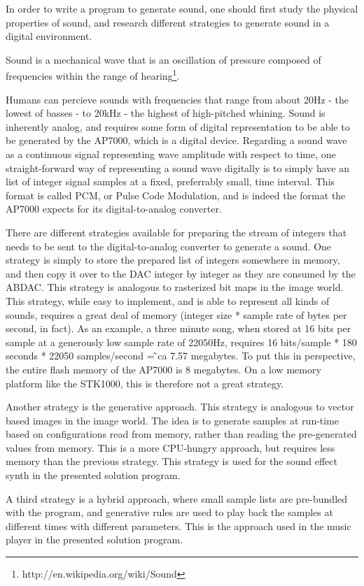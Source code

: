 In order to write a program to generate sound, one should first study the physical properties of sound, and research different strategies to generate sound in a digital environment.

Sound is a mechanical wave that is an oscillation of pressure composed of frequencies within the range of hearing\footnote{http://en.wikipedia.org/wiki/Sound}.

Humans can percieve sounds with frequencies that range from about 20Hz - the lowest of basses - to 20kHz - the highest of high-pitched whining.
Sound is inherently analog, and requires some form of digital representation to be able to be generated by the AP7000, which is a digital device.
Regarding a sound wave as a continuous signal representing wave amplitude with respect to time, one straight-forward way of representing a sound wave digitally is to simply have an list of integer signal samples at a fixed, preferrably small, time interval.
This format is called PCM, or Pulse Code Modulation, and is indeed the format the AP7000 expects for its digital-to-analog converter.

There are different strategies available for preparing the stream of integers that needs to be sent to the digital-to-analog converter to generate a sound.
One strategy is simply to store the prepared list of integers somewhere in memory, and then copy it over to the DAC integer by integer as they are consumed by the ABDAC.
This strategy is analogous to rasterized bit maps in the image world.
This strategy, while easy to implement, and is able to represent all kinds of sounds, requires a great deal of memory (integer size * sample rate of bytes per second, in fact).
As an example, a three minute song, when stored at 16 bits per sample at a generously low sample rate of 22050Hz, requires 16 bits/sample * 180 seconds * 22050 samples/second = ̃ca 7.57 megabytes.
To put this in perspective, the entire flash memory of the AP7000 is 8 megabytes.
On a low memory platform like the STK1000, this is therefore not a great strategy.

Another strategy is the generative approach.
This strategy is analogous to vector based images in the image world.
The idea is to generate samples at run-time based on configurations read from memory, rather than reading the pre-generated values from memory.
This is a more CPU-hungry approach, but requires less memory than the previous strategy.
This strategy is used for the sound effect synth in the presented solution program.

A third strategy is a hybrid approach, where small sample lists are pre-bundled with the program, and generative rules are used to play back the samples at different times with different parameters.
This is the approach used in the music player in the presented solution program.
